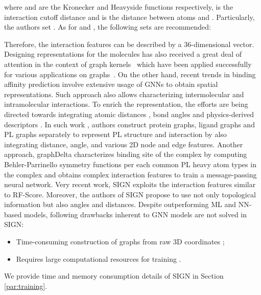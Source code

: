 \documentclass[nohyperref]{article}
\theoremstyle{plain}
\theoremstyle{definition}
\theoremstyle{remark}
\begin{document}
where  and  are the Kronecker and Heavyside functions respectively,  is the interaction cutoff distance and  is the distance between atoms  and . Particularly, the authors set . As for  and , the following sets are recommended:

Therefore, the interaction features can be described by a 36-dimensional vector. Designing representations for the molecules has also received a great deal of attention in the context of graph kernels~\cite{kriege2020survey, ivanov2018anonymous} which have been applied successfully for various applications on graphs~\cite{sharaev2018learning, ivanov2018learning}. 
On the other hand, recent trends in binding affinity prediction involve extensive usage of GNNs to obtain spatial representations. 
Such approach also allows characterizing intermolecular and intramolecular interactions. 
To enrich the representation, the efforts are being directed towards integrating atomic distances \cite{lim2019}, bond angles and physics-derived descriptors \cite{moon2022pignet}. 
In such work \cite{jiang2021interactiongraphnet}, authors construct protein graphs, ligand graphs and PL graphs separately to represent PL structure and interaction by also integrating distance, angle, and various 2D node and edge features. 
Another approach, graphDelta \cite{karlov2020graphdelta} characterizes binding site of the complex by computing Behler-Parrinello symmetry functions \cite{bps} per each common PL heavy atom types in the complex and obtains complex interaction features to train a message-passing neural network.
Very recent work, SIGN exploits the interaction features similar to RF-Score.
Moreover, the authors of SIGN propose to use not only topological information but also angles and distances. 
Despite outperforming ML and NN-based models, following drawbacks inherent to GNN models are not solved in SIGN:
\begin{itemize}
  \item Time-consuming construction of graphs from raw 3D coordinates \cite{wang2012fast};
  \item Requires large computational resources for training \cite{liu2020efficient}.
\end{itemize}
We provide time and memory consumption details of SIGN in Section \ref{par:training}.
\end{document}
